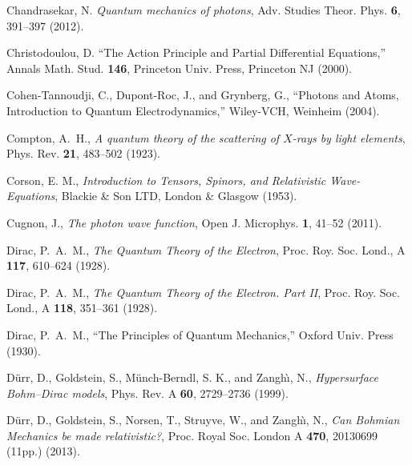 \documentclass[12pt]{article}
\theoremstyle{definition}
\numberwithin{equation}{section}
\begin{document}
\begin{thebibliography}{[KTZ2020]}
  Chandrasekar, N.
     \textit{Quantum mechanics of photons},
     Adv. Studies Theor. Phys. \textbf{6}, 391--397 (2012). \vspace{-4pt}

   Christodoulou, D.
          ``{The Action Principle and Partial Differential Equations},''
   Annals Math. Stud. {\bf 146},
   Princeton Univ. Press, Princeton NJ (2000).\vspace{-4pt}

   Cohen-Tannoudji, C., Dupont-Roc, J., and Grynberg, G.,
   {``Photons and Atoms, Introduction to Quantum Electrodynamics,''}
   Wiley-VCH, Weinheim (2004).

 Compton, A.~H.,
 \textit{A quantum theory of the scattering of $X$-rays by light elements},
 Phys. Rev. \textbf{21}, 483--502 (1923).\vspace{-4pt}

Corson, E. M.,
\textit{Introduction to Tensors, Spinors, and Relativistic Wave-Equations},
Blackie \& Son LTD, London \& Glasgow (1953).

 Cugnon, J.,
 \textit{The photon wave function},
 Open J. Microphys. \textbf{1}, 41--52 (2011). \vspace{-4pt}

  Dirac, P.~A.~M.,
  \textit{The Quantum Theory of the Electron},
  Proc. Roy. Soc. Lond., A \textbf{117}, 610--624 (1928). \vspace{-4pt}

  Dirac, P.~A.~M.,
  \textit{The Quantum Theory of the Electron. Part II},
  Proc. Roy. Soc. Lond., A \textbf{118}, 351--361 (1928). \vspace{-4pt}

  Dirac, P.~A.~M.,
  ``{The Principles of Quantum Mechanics},''
  Oxford Univ. Press (1930).%


\newblock D\"urr, D., Goldstein, S., M\"unch-Berndl, S. K., and Zangh\`{\i}, N., 
\newblock \textit{Hypersurface Bohm--Dirac models},
\newblock Phys. Rev. A \textbf{60}, 2729--2736 (1999).\vspace{-4pt}

\newblock D\"urr, D., Goldstein, S., Norsen, T., Struyve, W., and Zangh\`{\i}, N., 
\newblock \textit{Can Bohmian Mechanics be made relativistic?},
\newblock Proc. Royal Soc. London A \textbf{470}, 20130699 (11pp.) (2013).\vspace{-4pt}


\end{thebibliography}
\end{document}
